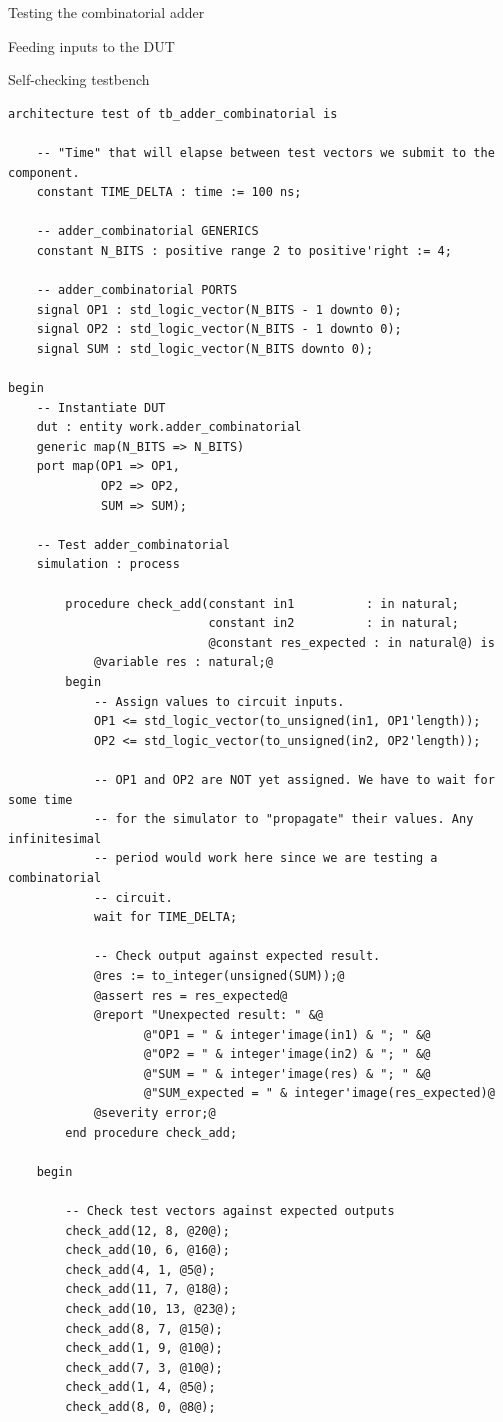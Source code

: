 \documentclass[lab]{course}
\begin{document}
\begin{section}{Testing the combinatorial adder}
\begin{subsection}{Feeding inputs to the DUT}
\begin{subsubsection}{Self-checking testbench}
\begin{lstlisting}
architecture test of tb_adder_combinatorial is

    -- "Time" that will elapse between test vectors we submit to the component.
    constant TIME_DELTA : time := 100 ns;

    -- adder_combinatorial GENERICS
    constant N_BITS : positive range 2 to positive'right := 4;

    -- adder_combinatorial PORTS
    signal OP1 : std_logic_vector(N_BITS - 1 downto 0);
    signal OP2 : std_logic_vector(N_BITS - 1 downto 0);
    signal SUM : std_logic_vector(N_BITS downto 0);

begin
    -- Instantiate DUT
    dut : entity work.adder_combinatorial
    generic map(N_BITS => N_BITS)
    port map(OP1 => OP1,
             OP2 => OP2,
             SUM => SUM);

    -- Test adder_combinatorial
    simulation : process

        procedure check_add(constant in1          : in natural;
                            constant in2          : in natural;
                            @constant res_expected : in natural@) is
            @variable res : natural;@
        begin
            -- Assign values to circuit inputs.
            OP1 <= std_logic_vector(to_unsigned(in1, OP1'length));
            OP2 <= std_logic_vector(to_unsigned(in2, OP2'length));

            -- OP1 and OP2 are NOT yet assigned. We have to wait for some time
            -- for the simulator to "propagate" their values. Any infinitesimal
            -- period would work here since we are testing a combinatorial
            -- circuit.
            wait for TIME_DELTA;

            -- Check output against expected result.
            @res := to_integer(unsigned(SUM));@
            @assert res = res_expected@
            @report "Unexpected result: " &@
                   @"OP1 = " & integer'image(in1) & "; " &@
                   @"OP2 = " & integer'image(in2) & "; " &@
                   @"SUM = " & integer'image(res) & "; " &@
                   @"SUM_expected = " & integer'image(res_expected)@
            @severity error;@
        end procedure check_add;

    begin

        -- Check test vectors against expected outputs
        check_add(12, 8, @20@);
        check_add(10, 6, @16@);
        check_add(4, 1, @5@);
        check_add(11, 7, @18@);
        check_add(10, 13, @23@);
        check_add(8, 7, @15@);
        check_add(1, 9, @10@);
        check_add(7, 3, @10@);
        check_add(1, 4, @5@);
        check_add(8, 0, @8@);


\end{lstlisting}
\end{subsubsection}
\end{subsection}
\end{section}
\end{document}
